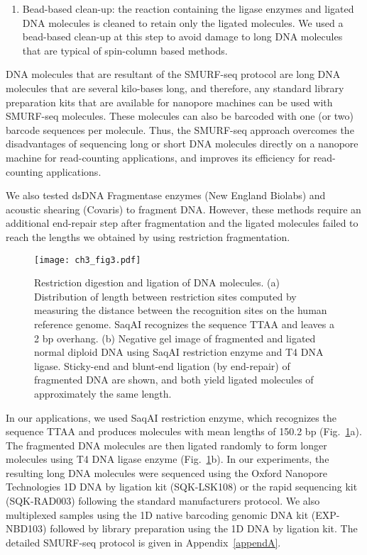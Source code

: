 \begin{enumerate}
\item Bead-based clean-up: the reaction containing the ligase enzymes and
  ligated DNA molecules is cleaned to retain only the ligated molecules. We
  used a bead-based clean-up at this step to avoid damage to long DNA
  molecules that are typical of spin-column based methods.
\end{enumerate}

DNA molecules that are resultant of the SMURF-seq protocol are long DNA
molecules that are several kilo-bases long, and therefore, any standard
library preparation kits that are available for nanopore machines can be
used with SMURF-seq molecules. These molecules can also be barcoded
with one (or two) barcode sequences per molecule. Thus, the SMURF-seq
approach overcomes the disadvantages of sequencing long or short DNA
molecules directly on a nanopore machine for read-counting applications,
and improves its efficiency for read-counting applications.

We also tested dsDNA Fragmentase enzymes (New England Biolabs) and
acoustic shearing (Covaris) to fragment DNA. However, these methods
require an additional end-repair step after fragmentation and the
ligated molecules failed to reach the lengths we obtained by using
restriction fragmentation.

\begin{figure}[t!]
\centering
\texttt{[image: ch3\_fig3.pdf]}
\caption[Restriction digestion and ligation of DNA molecules.]{
  Restriction digestion and ligation of DNA molecules.
  (a) Distribution of length between restriction sites computed
  by measuring the distance between the recognition sites on the human
  reference genome. SaqAI recognizes the sequence TTAA and leaves a 2 bp
  overhang.
  (b) Negative gel image of fragmented and ligated normal diploid DNA
  using SaqAI restriction enzyme and T4 DNA ligase.  Sticky-end and
  blunt-end ligation (by end-repair) of fragmented DNA are shown, and
  both yield ligated molecules of approximately the same length.}
\label{re_frag}
\end{figure}

In our applications, we used SaqAI restriction enzyme, which recognizes
the sequence TTAA and produces molecules with mean lengths of 150.2 bp
(Fig.~\ref{re_frag}a).
The fragmented DNA molecules are then ligated randomly to form longer
molecules using T4 DNA ligase enzyme (Fig.~\ref{re_frag}b).
%
In our experiments, the resulting long DNA molecules were sequenced
using the Oxford Nanopore Technologies 1D DNA by ligation kit
(SQK-LSK108) or the rapid sequencing kit (SQK-RAD003) following the
standard manufacturers protocol. We also multiplexed samples using the
1D native barcoding genomic DNA kit (EXP-NBD103) followed by library
preparation using the 1D DNA by ligation kit.
%
The detailed SMURF-seq protocol is given in Appendix~\ref{appendA}.


